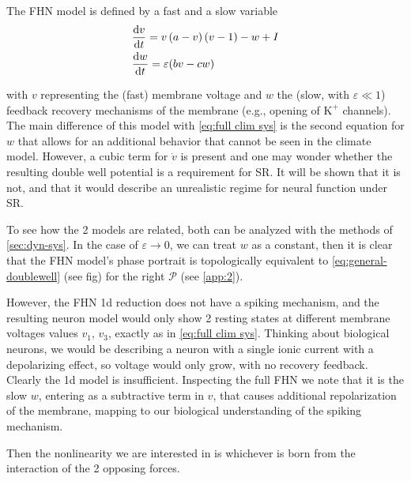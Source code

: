 The FHN model is defined by a fast and a slow variable
\begin{align}
    \label{eq:fhn-1}
    &\odv{v}{t} = v\left(a-v\right)\left(v-1\right)-w+I \\
    &\odv{w}{t} = \varepsilon (bv - cw)
\end{align}

with $v$ representing the (fast) membrane voltage and $w$ the (slow, with $\varepsilon \ll 1$) feedback recovery mechanisms of the membrane (e.g., opening of $\text{K}^+$ channels). 
The main difference of this model with \ref{eq:full clim sys} is the second equation for $w$ that allows for an additional behavior that cannot be seen in the climate model. 
However, a cubic term for $\dot{v}$ is present and one may wonder whether the resulting double well potential is a requirement for SR. It will be shown that it is not, and that it would describe an unrealistic regime for neural function under SR.

To see how the 2 models are related, both can be analyzed with the methods of \ref{sec:dyn-sys}. 
In the case of $\varepsilon \to 0$, we can treat $w$ as a constant, then it is clear that the FHN model's phase portrait is topologically equivalent to \ref{eq:general-doublewell} (see fig) for the right $\mathcal{P}$ (see \ref{app:2}).

However, the FHN 1d reduction does not have a spiking mechanism, and the resulting neuron model would only show 2 resting states at different membrane voltages values $v_1\text{, } v_3$, exactly as in \ref{eq:full clim sys}. 
Thinking about biological neurons, we would be describing a neuron with a single ionic current with a depolarizing effect, so voltage would only grow, with no recovery feedback. 
Clearly the 1d model is insufficient. 
Inspecting the full FHN we note that it is the slow $w$, entering as a subtractive term in $v$, that causes additional repolarization of the membrane, mapping to our biological understanding of the spiking mechanism. 

Then the nonlinearity we are interested in is whichever is born from the interaction of the 2 opposing forces.

